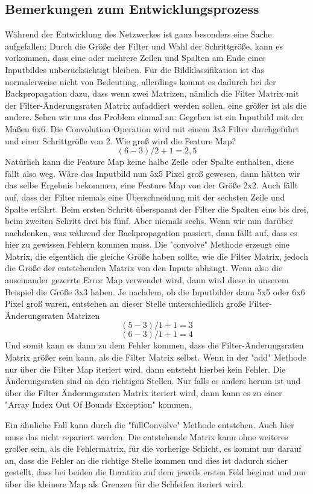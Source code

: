\documentclass[12pt]{article}
\begin{document}
\subsection{Bemerkungen zum Entwicklungsprozess}
Während der Entwicklung des Netzwerkes ist ganz besonders eine Sache aufgefallen: Durch die Größe der Filter und Wahl der Schrittgröße, kann es vorkommen, dass eine oder mehrere Zeilen und Spalten am Ende eines Inputbildes unberücksichtigt bleiben. Für die Bildklassifikation ist das normalerweise nicht von Bedeutung, allerdings kommt es dadurch bei der Backpropagation dazu, dass wenn zwei Matrizen, nämlich die Filter Matrix mit der Filter-Änderungsraten Matrix aufaddiert werden sollen, eine größer ist als die andere.
Sehen wir uns das Problem einmal an: Gegeben ist ein Inputbild mit der Maßen 6x6. Die Convolution Operation wird mit einem 3x3 Filter durchgeführt und einer Schrittgröße von 2. Wie groß wird die Feature Map? 
$$(6-3)/2+1 = 2,5$$
Natürlich kann die Feature Map keine halbe Zeile oder Spalte enthalten, diese fällt also weg. Wäre das Inputbild nun 5x5 Pixel groß gewesen, dann hätten wir das selbe Ergebnis bekommen, eine Feature Map von der Größe 2x2.
Auch fällt auf, dass der Filter niemals eine Überschneidung mit der sechsten Zeile und Spalte erfährt. Beim ersten Schritt überspannt der Filter die Spalten eins bis drei, beim zweiten Schritt drei bis fünf. Aber niemals sechs. 
Wenn wir nun darüber nachdenken, was während der Backpropagation passiert, dann fällt auf, dass es hier zu gewissen Fehlern kommen muss. Die "convolve" Methode erzeugt eine Matrix, die eigentlich die gleiche Größe haben sollte, wie die Filter Matrix, jedoch die Größe der entstehenden Matrix von den Inputs abhängt. Wenn also die auseinander gezerrte Error Map verwendet wird, dann wird diese in unserem Beispiel die Größe 3x3 haben. Je nachdem, ob die Inputbilder dann 5x5 oder 6x6 Pixel groß waren, entstehen an dieser Stelle unterschiedlich große Filter-Änderungsraten Matrizen
$$(5-3)/1+1 = 3$$
$$(6-3)/1+1 = 4$$
Und somit kann es dann zu dem Fehler kommen, dass die Filter-Änderungsraten Matrix größer sein kann, als die Filter Matrix selbst. Wenn in der "add" Methode nur über die Filter Map iteriert wird, dann entsteht hierbei kein Fehler. Die Änderungsraten sind an den richtigen Stellen. Nur falls es anders herum ist und über die Filter Änderungsraten Matrix iteriert wird, dann kann es zu einer "Array Index Out Of Bounds Exception" kommen. 

Ein ähnliche Fall kann durch die  "fullConvolve" Methode entstehen. Auch hier muss das nicht repariert werden. Die entstehende Matrix kann ohne weiteres großer sein, als die Fehlermatrix, für die vorherige Schicht, es kommt nur darauf an, dass die Fehler an die richtige Stelle kommen und dies ist dadurch sicher gestellt, dass bei beiden die Iteration auf dem jeweils ersten Feld beginnt und nur über die kleinere Map als Grenzen für die Schleifen iteriert wird.
\end{document}
